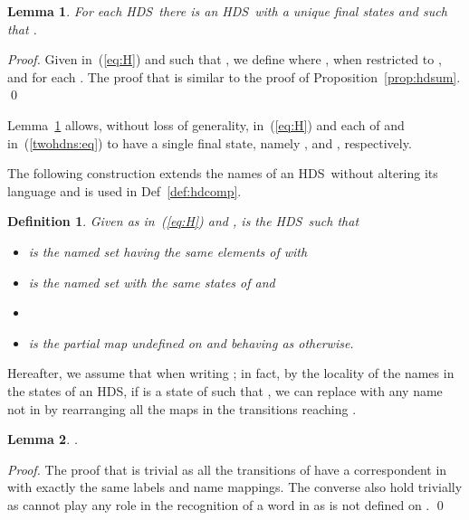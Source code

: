 \documentclass[runningheads,a4paper]{llncs}
\newcommand{\longversion}[1]{#1}
\newcommand{\hdns}{HDS}
\newtheorem{definition}{Theorem}[section]
\newtheorem{lemma}{Theorem}[section]
\newtheorem{definition}{Definition}[section]
\newtheorem{lemma}{Lemma}[section]
\begin{document}
\begin{lemma}\label{lemma:uniquefinal}
  For each \hdns\  there is an \hdns\  with a
  unique final states and such that .
\end{lemma}
\longversion{
  \begin{proof}
    Given  in~(\ref{eq:H}) and  such
    that , we define  where
    ,  when restricted to
    , and  for each .
The proof that  is similar
    to the proof of Proposition~\ref{prop:hdsum}.
    \qed
  \end{proof}
}
Lemma~\ref{lemma:uniquefinal} allows, without loss of generality,
 in~(\ref{eq:H}) and each of  and  in~(\ref{twohdns:eq}) to have a single final state, namely ,  and , respectively.

The following construction extends the names of an \hdns\ without
altering its language and is used in Def~\ref{def:hdcomp}.
\begin{definition}\label{def:hdaddname}
  Given  as in~(\ref{eq:H}) and ,  is the \hdns\
  such that
  \begin{itemize}
  \item  is the named set having the same elements of  with
    
  \item  is the named set with the same states of  and
    
  \item 
  \item  is the partial
    map undefined on  and behaving as  otherwise.
  \end{itemize}
\end{definition}
Hereafter, we assume that 
when writing ; in fact, by the locality of the
names in the states of an \hdns, if  is a state of 
such that , we can replace  with any name not in
 by rearranging all the maps in the transitions reaching
.
\begin{lemma}\label{prop:hdaddname}
  .
\end{lemma}
\longversion{
\begin{proof}
  The proof that  is trivial as all the transitions of  have a
  correspondent in  with exactly the same labels
  and name mappings.
The converse also hold trivially as  cannot play any role in the
  recognition of a word in  as  is not
  defined on .
  \qed
\end{proof}
}
\end{document}
